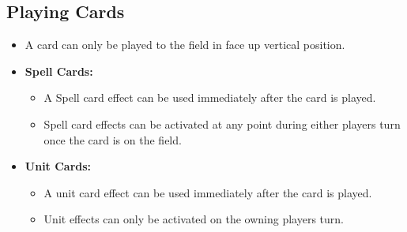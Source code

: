 \subsection{Playing Cards}
\begin{itemize}
    \item A card can only be played to the field in face up vertical position.
    \item \textbf{Spell Cards:}
    \begin{itemize}
        \item A Spell card effect can be used immediately after the card is played.
        \item Spell card effects can be activated at any point during either players turn once the card is on the field.
    \end{itemize}
    \item \textbf{Unit Cards:}
    \begin{itemize}
        \item A unit card effect can be used immediately after the card is played.
        \item Unit effects can only be activated on the owning players turn.
    \end{itemize}
\end{itemize}






